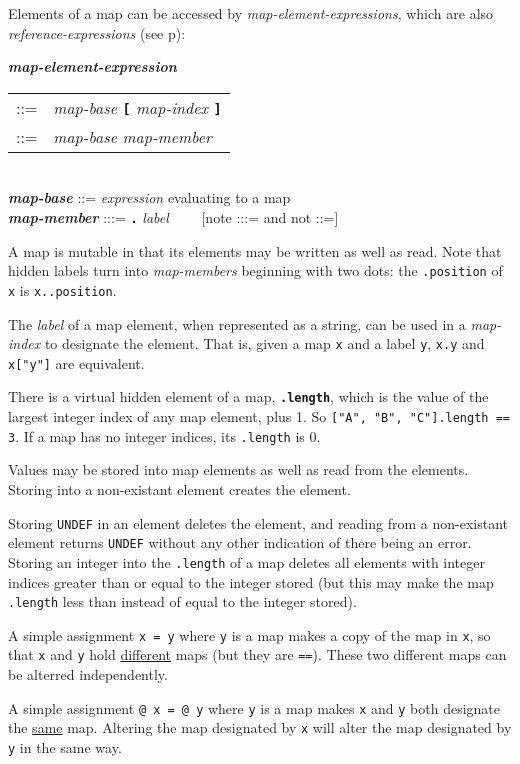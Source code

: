 \documentclass[12pt]{article}
\newcommand{\TT}[1]{{\tt \bfseries #1}}
\newcommand{\emkey}[1]{{\em \bfseries #1}}
\newcommand{\ttdkey}[1]{{\tt \bfseries .#1}}
\newcommand{\pagref}[1]{p\pageref{#1}}
\newenvironment{indpar}[1][0.3in]%
	{\begin{list}{}%
		     {\setlength{\itemsep}{0in}%
		      \setlength{\topsep}{0in}%
		      \setlength{\parsep}{1ex}%
		      \setlength{\labelwidth}{#1}%
		      \setlength{\leftmargin}{#1}%
		      \addtolength{\leftmargin}{\labelsep}}%
	 \item}%
	{\end{list}}
\begin{document}
Elements of a map can be accessed by {\em map-element-expressions}, which
are also {\em reference-expressions} (see \pagref{REFERENCE-EXPRESSIONS}):

\begin{indpar}
\emkey{map-element-expression}
    \begin{tabular}[t]{rl}
    ::= & {\em map-base} \TT{[} {\em map-index} \TT{]} \\
    ::= & {\em map-base} {\em map-member} \\
    \end{tabular}
\\[0.5ex]
\emkey{map-base} ::= {\em expression} evaluating to a map
\\[0.5ex]
\emkey{map-member} :::= \TT{.} {\em label} ~~~~[note :::= and not ::=]
\end{indpar}

A map is mutable in that its elements may be written as well as read.
Note that hidden labels turn into {\em map-members} beginning with
two dots: the {\tt .position} of {\tt x} is {\tt x..position}.

The {\em label} of a map element, when represented as a string, can
be used in a {\em map-index} to designate the element.  That is,
given a map {\tt x} and a label {\tt y}, {\tt x.y} and {\tt x["y"]}
are equivalent.

There is a virtual hidden element of a map, \ttdkey{length}, which is
the value of the largest integer index of any map element,
plus 1.  So {\tt ["A", "B", "C"].length == 3}.  If a map has no
integer indices, its {\tt .length} is 0.

Values may be stored into map elements as well as read from the
elements.  Storing into a non-existant element creates the element.

Storing {\tt UNDEF} in an element deletes the element, and reading
from a non-existant element returns {\tt UNDEF} without any other
indication of there being an error.  Storing an integer into the
{\tt .length} of a map deletes all elements with integer indices
greater than or equal to the integer stored (but this may make
the map {\tt .length} less than instead of equal to the integer stored).

A simple assignment {\tt x = y} where {\tt y} is a map makes
a copy of the map in {\tt x}, so that {\tt x} and {\tt y} hold
\underline{different} maps (but they are {\tt ==}).  These two different maps
can be alterred independently.

A simple assignment {\tt @ x = @ y} where {\tt y} is a map makes
{\tt x} and {\tt y} both designate the \underline{same} map.
Altering the map designated by {\tt x} will alter the map
designated by {\tt y} in the same way.
\end{document}
